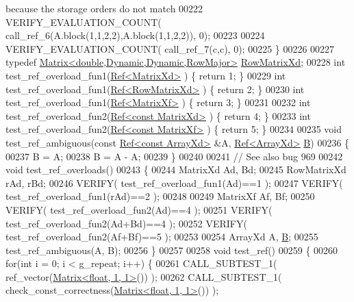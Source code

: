 \begin{DoxyCode}
{       because the storage orders do not match}
00222   VERIFY\_EVALUATION\_COUNT( call\_ref\_6(A.block(1,1,2,2),A.block(1,1,2,2)), 0);
00223   
00224   VERIFY\_EVALUATION\_COUNT( call\_ref\_7(c,c), 0);
00225 \}
00226 
00227 \textcolor{keyword}{typedef} \hyperlink{group___core___module_class_eigen_1_1_matrix}{Matrix<double,Dynamic,Dynamic,RowMajor>} 
      \hyperlink{group___core___module_class_eigen_1_1_matrix}{RowMatrixXd};
00228 \textcolor{keywordtype}{int} test\_ref\_overload\_fun1(\hyperlink{group___core___module_class_eigen_1_1_ref}{Ref<MatrixXd>} )       \{ \textcolor{keywordflow}{return} 1; \}
00229 \textcolor{keywordtype}{int} test\_ref\_overload\_fun1(\hyperlink{group___core___module_class_eigen_1_1_ref}{Ref<RowMatrixXd>} )    \{ \textcolor{keywordflow}{return} 2; \}
00230 \textcolor{keywordtype}{int} test\_ref\_overload\_fun1(\hyperlink{group___core___module_class_eigen_1_1_ref}{Ref<MatrixXf>} )       \{ \textcolor{keywordflow}{return} 3; \}
00231 
00232 \textcolor{keywordtype}{int} test\_ref\_overload\_fun2(\hyperlink{group___core___module_class_eigen_1_1_ref}{Ref<const MatrixXd>} ) \{ \textcolor{keywordflow}{return} 4; \}
00233 \textcolor{keywordtype}{int} test\_ref\_overload\_fun2(\hyperlink{group___core___module_class_eigen_1_1_ref}{Ref<const MatrixXf>} ) \{ \textcolor{keywordflow}{return} 5; \}
00234 
00235 \textcolor{keywordtype}{void} test\_ref\_ambiguous(\textcolor{keyword}{const} \hyperlink{group___core___module_class_eigen_1_1_ref}{Ref<const ArrayXd>} &A, 
      \hyperlink{group___core___module_class_eigen_1_1_ref}{Ref<ArrayXd>} \hyperlink{group___core___module_class_eigen_1_1_matrix}{B})
00236 \{
00237   B = A;
00238   B = A - A;
00239 \}
00240 
00241 \textcolor{comment}{// See also bug 969}
00242 \textcolor{keywordtype}{void} test\_ref\_overloads()
00243 \{
00244   MatrixXd Ad, Bd;
00245   RowMatrixXd rAd, rBd;
00246   VERIFY( test\_ref\_overload\_fun1(Ad)==1 );
00247   VERIFY( test\_ref\_overload\_fun1(rAd)==2 );
00248   
00249   MatrixXf Af, Bf;
00250   VERIFY( test\_ref\_overload\_fun2(Ad)==4 );
00251   VERIFY( test\_ref\_overload\_fun2(Ad+Bd)==4 );
00252   VERIFY( test\_ref\_overload\_fun2(Af+Bf)==5 );
00253   
00254   ArrayXd A, \hyperlink{group___core___module_class_eigen_1_1_matrix}{B};
00255   test\_ref\_ambiguous(A, B);
00256 \}
00257 
00258 \textcolor{keywordtype}{void} test\_ref()
00259 \{
00260   \textcolor{keywordflow}{for}(\textcolor{keywordtype}{int} i = 0; i < g\_repeat; i++) \{
00261     CALL\_SUBTEST\_1( ref\_vector(\hyperlink{group___core___module_class_eigen_1_1_matrix}{Matrix<float, 1, 1>}()) );
00262     CALL\_SUBTEST\_1( check\_const\_correctness(\hyperlink{group___core___module_class_eigen_1_1_matrix}{Matrix<float, 1, 1>}()) );

\end{DoxyCode}
